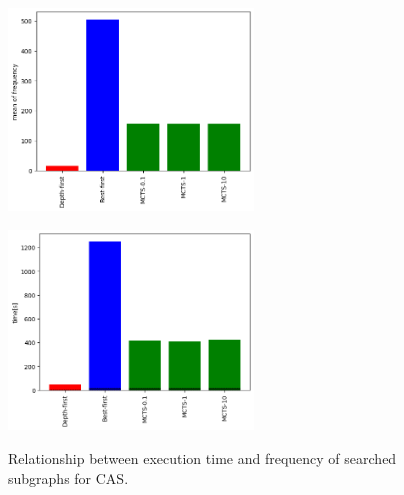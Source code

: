 \begin{figure}[htbp]
 \begin{minipage}{0.5\hsize}
  \begin{center}
   \includegraphics[width=65mm]{img/frequency.png}
  \end{center}
  \label{fig:frequency}
 \end{minipage}
 \begin{minipage}{0.5\hsize}
  \begin{center}
   \includegraphics[width=65mm]{img/time.png}
  \end{center}
  \label{fig:time}
 \end{minipage}
 \caption{Relationship between execution time and frequency of searched subgraphs for CAS.}
  \label{fig:frequency_time}
\end{figure}

